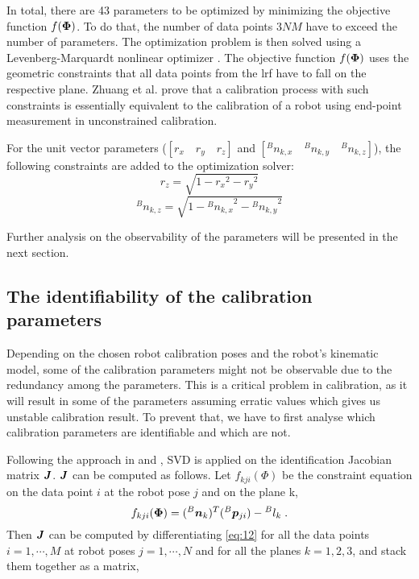 In total, there are 43 parameters to be optimized by minimizing the objective function $f(\vb*{\Phi})$. To do that, the number of data points $3NM$ have to exceed the number of parameters. The optimization problem is then solved using a Levenberg-Marquardt nonlinear optimizer \cite{Newville2014}. The objective function $f(\vb*{\Phi})$ uses the geometric constraints that all data points from the \ac{lrf} have to fall on the respective plane. Zhuang et al. \cite{Zhuang1999} prove that a calibration process with such constraints is essentially equivalent to the calibration of a robot using end-point measurement in unconstrained calibration. 

For the unit vector parameters ($[r_x \quad r_y \quad r_z ]$ and  $[{^B}n_{k,x} \quad {^B}n_{k,y} \quad {^B}n_{k,z}]$), the following constraints are added to the optimization solver:
\begin{equation}
\label{eq:10}
{r_z} = \sqrt{1 - {r_x}^2 - {r_y}^2}
\end{equation}
\begin{equation}
\label{eq:11}
{^B}n_{k,z} = \sqrt{1 - {{^B}n_{k,x}}^2 - {{^B}n_{k,y}}^2}
\end{equation}

Further analysis on the observability of the parameters will be presented in the next section. 

\subsection{The identifiability of the calibration parameters}
\label{sec:third_step}

Depending on the chosen robot calibration poses and the robot's kinematic model, some of the calibration parameters might not be observable due to the redundancy among the parameters. This is a critical problem in calibration, as it will result in some of the parameters assuming erratic values which gives us unstable calibration result. To prevent that, we have to first analyse which calibration parameters are identifiable and which are not. 

Following the approach in \cite{Joubair2015} and \cite{Hollerbach1996}, SVD is applied on the identification Jacobian matrix $\vb*{J}$. $\vb*{J}$ can be computed as follows. Let  $f_{kji}(\Phi)$ be the constraint equation on the data point $i$ at the robot pose $j$ and on the plane k, 
\begin{equation}
\label{eq:12}
 f_{kji}(\vb*{\Phi}) =  ({^B}\vb*{n}_k) ^T ({^B}\vb*{p}_{ji}) - {^B}l_k \; .
\end{equation}
Then $\vb*{J}$ can be computed by differentiating \eqref{eq:12} for all the data points $i = 1, \cdots, M$ at robot poses $j = 1, \cdots, N$ and for all the planes $k=1,2,3$, and stack them together as a matrix,

